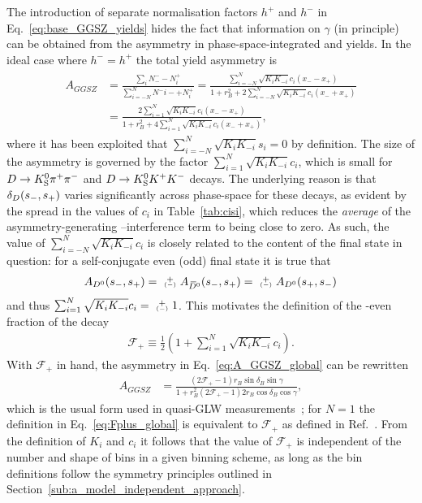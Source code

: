 The introduction of separate normalisation factors $h^+$ and $h^-$ in Eq.~\eqref{eq:base_GGSZ_yields} hides the fact that information on $\gamma$ (in principle) can be obtained from the asymmetry in phase-space-integrated \Bp and \Bm yields. In the ideal case where $h^-=h^+$ the total yield asymmetry is 
\begin{align}\begin{split}\label{eq:A_GGSZ_global}
    A_{GGSZ} &= \frac{\sum_i N^-_- - N^+_i}{\sum_{i=-N}^N N^-i- + N^+_i}
    = \frac{ \sum_{i=-N}^N \sqrt{K_iK_{-i}}c_i (x_- - x_+)}{1 + r_B^2 +2 \sum_{i=-N}^N \sqrt{K_iK_{-i}}c_i (x_- + x_+)} \\
    &=\frac{2 \sum_{i=1}^N \sqrt{K_iK_{-i}}c_i (x_- - x_+)}{1 + r_B^2 +4 \sum_{i=1}^N \sqrt{K_iK_{-i}}c_i (x_- + x_+) },
\end{split}\end{align}
where it has been exploited that $\sum_{i=-N}^N \sqrt{K_iK_{-i}}s_i=0$ by definition. The size of the asymmetry is governed by the factor $\sum_{i=1}^N \sqrt{K_iK_{-i}}c_i$, which is small for ${{D}\rightarrow{\ensuremath{{K}^0_{\mathrm{S}}}}{\ensuremath{{\pi}^+}}{\ensuremath{{\pi}^-}}}$ and ${D}\rightarrow{\ensuremath{{K}^0_{\mathrm{S}}}}{\ensuremath{{K}^+}}{\ensuremath{{K}^-}}$ decays. The underlying reason is that $\delta_D(s_-, s_+)$ varies significantly across phase-space for these decays, as evident by the spread in the values of $c_i$ in Table~\ref{tab:cisi}, which reduces the \emph{average} of the asymmetry-generating \Dz--\Dzb interference term to being close to zero. As such, the value of $\sum_{i=-N}^N \sqrt{K_iK_{-i}}c_i$ is closely related to the \CP content of the final state in question: for a self-conjugate \CP even (odd) final state it is true that 
\begin{align}
    {A_\Dz(\sm, \sp)=\varpm A_\Dzb(\sm, \sp)=\varpm A_\Dz(\sp, \sm)}
\end{align}
 and thus $\sum_{i=1}^N \sqrt{K_iK_{-i}}c_i= \varpm 1$. This motivates the definition of the \CP-even fraction of the decay
\begin{align}\label{eq:Fplus_global}
    \mathcal F_+ \equiv \frac{1}{2}\left(1 + \sum_{i=1}^N \sqrt{K_i K_{-i}}c_i\right).
\end{align}
 With $\mathcal F_+$ in hand, the asymmetry in Eq.~\eqref{eq:A_GGSZ_global} can be rewritten
\begin{align}
    A_{GGSZ} &= \frac{(2\mathcal F_+-1) r_B \sin \delta_B \sin \gamma}{1 + r_B^2 (2\mathcal F_+-1) 2 r_B \cos \delta_B \cos \gamma},
\end{align}
which is the usual form used in quasi-GLW measurements~\cite{}; for $N=1$ the definition in Eq.~\eqref{eq:Fplus_global} is equivalent to $\mathcal F_+$ as defined in Ref.~\cite{}. From the definition of $K_i$ and $c_i$ it follows that the value of $\mathcal F_+$ is independent of the number and shape of bins in a given binning scheme, as long as the bin definitions follow the symmetry principles outlined in Section~\ref{sub:a_model_independent_approach}. 
